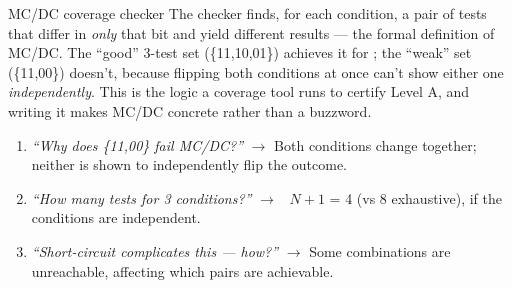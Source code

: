 \begin{gymproblem}{MC/DC coverage checker}
The checker finds, for each condition, a pair of tests that differ in \emph{only}
that bit and yield different results --- the formal definition of MC/DC. The
``good'' 3-test set (\{11,10,01\}) achieves it for ; the ``weak''
set (\{11,00\}) doesn't, because flipping both conditions at once can't show
either one \emph{independently}. This is the logic a coverage tool runs to certify
Level A, and writing it makes MC/DC concrete rather than a buzzword.

\followups
\begin{enumerate}
\item \emph{``Why does \{11,00\} fail MC/DC?''} $\rightarrow$ Both conditions
  change together; neither is shown to independently flip the outcome.
\item \emph{``How many tests for 3 conditions?''} $\rightarrow$ ~$N+1$ = 4 (vs 8
  exhaustive), if the conditions are independent.
\item \emph{``Short-circuit \code{\&\&} complicates this --- how?''}
  $\rightarrow$ Some combinations are unreachable, affecting which pairs are
  achievable.
\end{enumerate}
\end{gymproblem}

